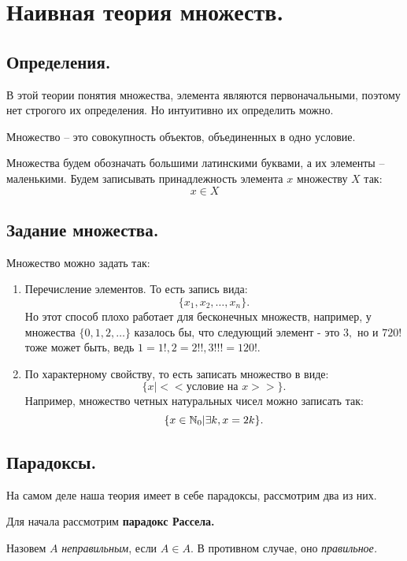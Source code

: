 
\section{Наивная теория множеств.}
\subsection{Определения.}

В этой теории понятия множества, элемента являются первоначальными, поэтому нет строгого их определения. Но интуитивно их определить можно.

\begin{definition}
Множество -- это совокупность объектов, объединенных в одно условие.
\end{definition}

Множества будем обозначать большими латинскими буквами, а их элементы -- маленькими. Будем записывать принадлежность элемента $x$ множеству $X$ так: $$x \in X$$

\subsection{Задание множества.}

Множество можно задать так:
\begin{enumerate}
    \item Перечисление элементов. То есть запись вида:
    $$\{x_1, x_2, \dots, x_n\}.$$
    Но этот способ плохо работает для бесконечных множеств, например, у множества $\{0, 1, 2, \dots\}$ казалось бы, что следующий элемент - это $3,$ но и $720!$ тоже может быть, ведь $1 = 1!, 2 = 2!!, 3!!!= 120!.$
    \item По характерному свойству, то есть записать множество в виде:
    $$\{ x | <<\text{условие на } x >> \}.$$
    Например, множество четных натуральных чисел можно записать так:
    $$\{ x \in \mathbb{N}_0 | \exists k, x = 2k \}.$$
\end{enumerate}

\subsection{Парадоксы.}

На самом деле наша теория имеет в себе парадоксы, рассмотрим два из них. 

Для начала рассмотрим \textbf{парадокс Рассела.}

Назовем $A$ \textit{неправильным}, если $A \in A.$ В противном случае, оно \textit{правильное.}

